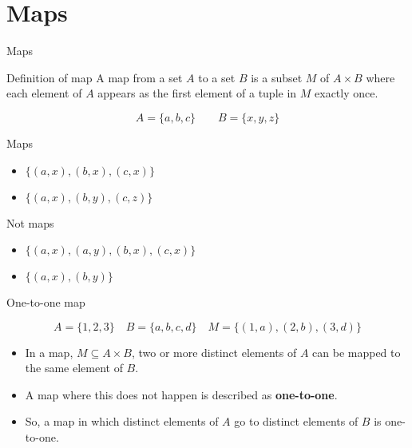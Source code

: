 \section{Maps}

\begin{frame}{Maps}

  \begin{alertblock}{Definition of map}
    A map from a set $A$ to a set $B$ is a subset $M$ of $A \times B$ where each element of $A$ appears as the first element of a tuple in $M$ exactly once.
  \end{alertblock}

  \begin{topdisp}
    $$A = \{a,b,c\} \qquad B = \{x,y,z\}$$
  \end{topdisp}

  \begin{minipage}[t]{0.48\linewidth}
  \begin{exampleblock}{Maps}
    \begin{itemize}
      \item $\{(a,x),(b,x),(c,x)\}$
      \item $\{(a,x),(b,y),(c,z)\}$
    \end{itemize}
  \end{exampleblock}
\end{minipage}
\begin{minipage}[t]{0.48\linewidth}
  \begin{exampleblock}{Not maps}
    \begin{itemize}
      \item $\{(a,x),(a,y),(b,x),(c,x)\}$
      \item $\{(a,x),(b,y)\}$
    \end{itemize}
  \end{exampleblock}
\end{minipage}
\end{frame}


\begin{frame}{One-to-one map}
  \begin{topdisp}
    $$ A = \{1,2,3\} \quad  B = \{a,b,c,d\} \quad  M = \{ (1,a), (2,b), (3,d) \} $$
  \end{topdisp}
  \begin{itemize}
    \setlength\itemsep{3mm}
    \item In a map, $M \subseteq A \times B$, two or more distinct elements of $A$ can be mapped to the same element of $B$.
    \item A map where this does not happen is described as \textbf{one-to-one}.
    \item So, a map in which distinct elements of $A$ go to distinct elements of $B$ is one-to-one.
  \end{itemize}
\end{frame}

